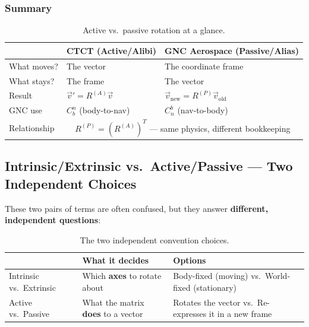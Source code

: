 \documentclass[12pt,a4paper]{article}
\begin{document}
\subsubsection*{Summary}

\begin{table}[h]
\centering
\begin{tabular}{@{}p{2.5cm}p{5.5cm}p{5.5cm}@{}}
\toprule
 & \textbf{CTCT (Active/Alibi)} & \textbf{GNC Aerospace (Passive/Alias)} \\
\midrule
What moves?   & The vector             & The coordinate frame \\
What stays?   & The frame              & The vector \\
Result        & $\vec{v}'=R^{(A)}\vec{v}$ &
                $\vec{v}_{\text{new}}=R^{(P)}\vec{v}_{\text{old}}$ \\
GNC use       & $C_b^n$ (body-to-nav)  & $C_n^b$ (nav-to-body) \\
Relationship  & \multicolumn{2}{c}{$R^{(P)} = (R^{(A)})^T$ --- same physics,
                different bookkeeping} \\
\bottomrule
\end{tabular}
\caption{Active vs.\ passive rotation at a glance.}
\end{table}

\subsection{Intrinsic/Extrinsic vs.\ Active/Passive --- Two Independent Choices}

These two pairs of terms are often confused, but they answer
\textbf{different, independent questions}:

\begin{table}[h]
\centering
\begin{tabular}{@{}p{4.5cm}p{4.5cm}p{4.5cm}@{}}
\toprule
 & \textbf{What it decides} & \textbf{Options} \\
\midrule
Intrinsic vs.\ Extrinsic &
  Which \textbf{axes} to rotate about &
  Body-fixed (moving) vs.\ World-fixed (stationary) \\
Active vs.\ Passive &
  What the matrix \textbf{does} to a vector &
  Rotates the vector vs.\ Re-expresses it in a new frame \\
\bottomrule
\end{tabular}
\caption{The two independent convention choices.}
\end{table}
\end{document}
